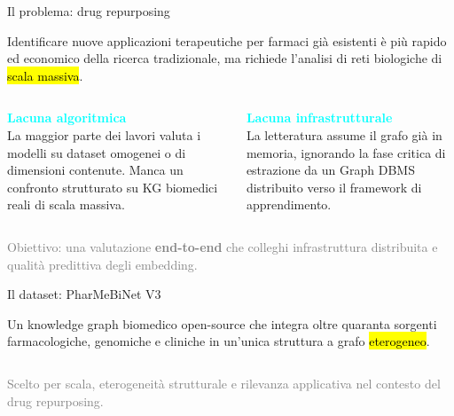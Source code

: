 \documentclass{beamer}
\begin{document}
\begin{frame}{Il problema: drug repurposing}

  Identificare nuove applicazioni terapeutiche per farmaci già esistenti
  è più rapido ed economico della ricerca tradizionale, ma richiede
  l'analisi di reti biologiche di \hl{scala massiva}.

  \vspace{0.8em}

  \begin{columns}[t]
      \textcolor{Cyan}{\textbf{Lacuna algoritmica}}\\[4pt]
      \small La maggior parte dei lavori valuta i modelli su dataset
      omogenei o di dimensioni contenute. Manca un confronto strutturato
      su KG biomedici reali di scala massiva.

      \textcolor{Cyan}{\textbf{Lacuna infrastrutturale}}\\[4pt]
      \small La letteratura assume il grafo già in memoria, ignorando
      la fase critica di estrazione da un Graph DBMS distribuito verso
      il framework di apprendimento.

  \end{columns}

  \vspace{0.8em}

  \begin{center}
    \small\textcolor{Gray}{Obiettivo: una valutazione \textbf{end-to-end}
    che colleghi infrastruttura distribuita e qualità predittiva degli embedding.}
  \end{center}

\end{frame}



\begin{frame}{Il dataset: PharMeBiNet V3}

  Un knowledge graph biomedico open-source che integra oltre
  quaranta sorgenti farmacologiche, genomiche e cliniche in
  un'unica struttura a grafo \hl{eterogeneo}.

  \vspace{1em}

  \begin{columns}[c]


  \end{columns}

  \vspace{1em}

  \begin{center}
    \small\textcolor{Gray}{Scelto per scala, eterogeneità strutturale
    e rilevanza applicativa nel contesto del drug repurposing.}
  \end{center}

\end{frame}
\end{document}
